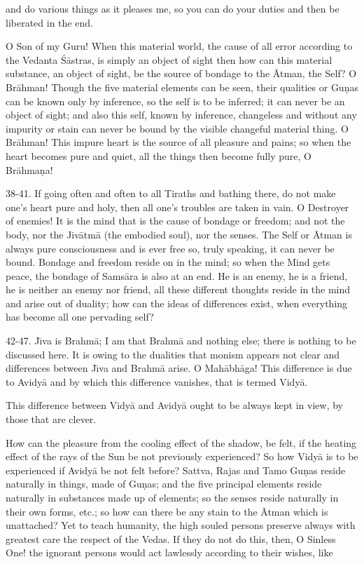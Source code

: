 and do various things as it pleases me, so you can do your duties and then be liberated in the end.

O Son of my Guru! When this material world, the cause of all error according to the Vedanta \'S\=astras, is simply an object of sight then how can this material substance, an object of sight, be the source of bondage to the \=Atman, the Self? O Br\=ahman! Though the five material elements can be seen, their qualities or Gu\d{n}as can be known only by inference, so the self is to be inferred; it can never be an object of sight; and also this self, known by inference, changeless and without any impurity or stain can never be bound by the visible changeful material thing. O Br\=ahman! This impure heart is the source of all pleasure and pains; so when the heart becomes pure and quiet, all the things then become fully pure, O Br\=ahma\d{n}a!

38-41. If going often and often to all Tiraths and bathing there, do not make one's heart pure and holy, then all one's troubles are taken in vain. O Destroyer of enemies! It is the mind that is the cause of bondage or freedom; and not the body, nor the Jiv\=atm\=a (the embodied soul), nor the senses. The Self or \=Atman is always pure consciousness and is ever free so, truly speaking, it can never be bound. Bondage and freedom reside on in the mind; so when the Mind gets peace, the bondage of Sams\=ara is also at an end. He is an enemy, he is a friend, he is neither an enemy nor friend, all these different thoughts reside in the mind and arise out of duality; how can the ideas of differences exist, when everything has become all one pervading self?

42-47. J\={\i}va is Brahm\=a; I am that Brahm\=a and nothing else; there is nothing to be discussed here. It is owing to the dualities that monism appears not clear and differences between J\={\i}va and Brahm\=a arise. O Mah\=abh\=aga! This difference is due to Avidy\=a and by which this difference vanishes, that is termed Vidy\=a.

This difference between Vidy\=a and Avidy\=a ought to be always kept in view, by those that are clever.

How can the pleasure from the cooling effect of the shadow, be felt, if the heating effect of the rays of the Sun be not previously experienced? So how Vidy\=a is to be experienced if Avidy\=a be not felt before? Sattva, Rajas and Tamo Gu\d{n}as reside naturally in things, made of Gu\d{n}as; and the five principal elements reside naturally in substances made up of elements; so the senses reside naturally in their own forms, etc.; so how can there be any stain to the \=Atman which is unattached? Yet to teach humanity, the high souled persons preserve always with greatest care the respect of the Vedas. If they do not do this, then, O Sinless One! the ignorant persons would act lawlessly according to their wishes, like

